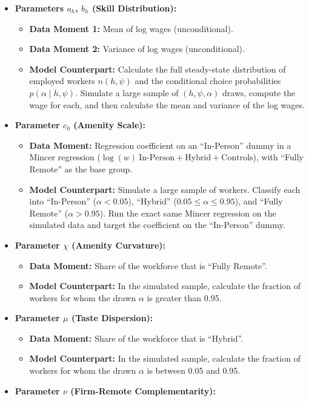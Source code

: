 \documentclass[
  11pt,
  letterpaper,
  DIV=11,
  numbers=noendperiod]{scrartcl}
\providecommand{\tightlist}{%
  \setlength{\itemsep}{0pt}\setlength{\parskip}{0pt}}\usepackage{longtable,booktabs,array}
\begin{document}
\begin{itemize}
\tightlist
\item
  \textbf{Parameters \(a_h\), \(b_h\) (Skill Distribution):}

  \begin{itemize}
  \tightlist
  \item
    \textbf{Data Moment 1:} Mean of log wages (unconditional).
  \item
    \textbf{Data Moment 2:} Variance of log wages (unconditional).
  \item
    \textbf{Model Counterpart:} Calculate the full steady-state
    distribution of employed workers \(n(h,\psi)\) and the conditional
    choice probabilities \(p(\alpha\mid h,\psi)\). Simulate a large
    sample of \((h,\psi,\alpha)\) draws, compute the wage for each, and
    then calculate the mean and variance of the log wages.
  \end{itemize}
\item
  \textbf{Parameter \(c_{0}\) (Amenity Scale):}

  \begin{itemize}
  \tightlist
  \item
    \textbf{Data Moment:} Regression coefficient on an ``In-Person''
    dummy in a Mincer regression
    (\(\log(w) ~ \text{In-Person} + \text{Hybrid} + \text{Controls}\)),
    with ``Fully Remote'' as the base group.
  \item
    \textbf{Model Counterpart:} Simulate a large sample of workers.
    Classify each into ``In-Person'' (\(\alpha < 0.05\)), ``Hybrid''
    (\(0.05 \leq \alpha \leq 0.95\)), and ``Fully Remote''
    (\(\alpha > 0.95\)). Run the exact same Mincer regression on the
    simulated data and target the coefficient on the ``In-Person''
    dummy.
  \end{itemize}
\item
  \textbf{Parameter \(\chi\) (Amenity Curvature):}

  \begin{itemize}
  \tightlist
  \item
    \textbf{Data Moment:} Share of the workforce that is ``Fully
    Remote''.
  \item
    \textbf{Model Counterpart:} In the simulated sample, calculate the
    fraction of workers for whom the drawn \(\alpha\) is greater than
    0.95.
  \end{itemize}
\item
  \textbf{Parameter \(\mu\) (Taste Dispersion):}

  \begin{itemize}
  \tightlist
  \item
    \textbf{Data Moment:} Share of the workforce that is ``Hybrid''.
  \item
    \textbf{Model Counterpart:} In the simulated sample, calculate the
    fraction of workers for whom the drawn \(\alpha\) is between 0.05
    and 0.95.
  \end{itemize}
\item
  \textbf{Parameter \(\nu\) (Firm-Remote Complementarity):}


\end{itemize}
\end{document}

